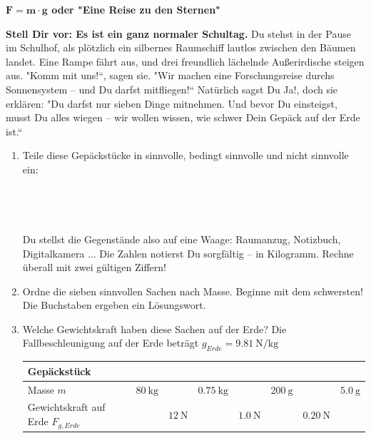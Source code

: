 \documentclass[a4paper]{article}
\begin{document}
{\LARGE \bf $ \mathbf{F= m \cdot g} $ oder "Eine Reise zu den Sternen"}
\vspace{1,5 cm}

\noindent
{\bf Stell Dir vor: Es ist ein ganz normaler Schultag.}
Du stehst in der Pause im Schulhof, als plötzlich ein silbernes Raumschiff lautlos zwischen den Bäumen landet. Eine Rampe fährt aus, und drei freundlich lächelnde Außerirdische steigen aus.
"Komm mit uns!“, sagen sie. "Wir machen eine Forschungsreise durchs Sonnensystem – und Du darfst mitfliegen!“
Natürlich sagst Du Ja!, doch sie erklären:
"Du darfst nur sieben Dinge mitnehmen. Und bevor Du einsteigst, musst Du alles wiegen – wir wollen wissen, wie schwer Dein Gepäck auf der Erde ist.“




\begin{enumerate}[1.] 
\item Teile diese Gepäckstücke in  sinnvolle, bedingt sinnvolle und nicht sinnvolle ein:\\
\noindent{}
\\
\\
\\
\\

Du stellst die Gegenstände also auf eine Waage: Raumanzug, Notizbuch, Digitalkamera ...
Die Zahlen notierst Du sorgfältig – in Kilogramm. Rechne überall mit zwei gültigen Ziffern!

\item Ordne die sieben sinnvollen Sachen nach Masse. Beginne mit dem schwersten! Die Buchstaben ergeben ein Lösungswort.
\item Welche Gewichtskraft haben diese Sachen auf der Erde? Die Fallbeschleunigung auf der Erde beträgt $g_{Erde}=\SI{9,81}{\newton\per\kilogram}$

\renewcommand{\arraystretch}{2}
\begin{tabular}{|p{3 cm}|p{}|p{}|p{}|p{}|p{}|p{}|p{}|}
	\hline
	Gepäckstück	& & & & & & & \\
	\hline
	Masse $m$    & $\SI{80}{\kilogram}$ & & $\SI{0,75}{\kilogram}$& & $\SI{200}{\gram}$&& $\SI{5,0}{\gram}$\\
	\hline
	Gewichtskraft auf Erde $F_{g, Erde}$    & & $\SI{12}{\newton}$ & & $\SI{1,0}{\newton}$ & &  $\SI{0,20}{\newton}$ & \\
	\hline
\end{tabular}




\end{enumerate}
\end{document}
